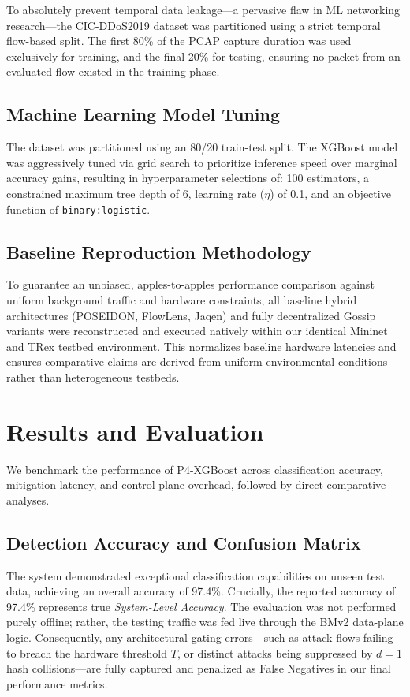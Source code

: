 \documentclass[sigconf, nonacm]{acmart}
\begin{document}
To absolutely prevent temporal data leakage—a pervasive flaw in ML networking research—the CIC-DDoS2019 dataset was partitioned using a strict temporal flow-based split. The first 80\% of the PCAP capture duration was used exclusively for training, and the final 20\% for testing, ensuring no packet from an evaluated flow existed in the training phase.

\subsection{Machine Learning Model Tuning}
The dataset was partitioned using an 80/20 train-test split. The XGBoost model was aggressively tuned via grid search to prioritize inference speed over marginal accuracy gains, resulting in hyperparameter selections of: 100 estimators, a constrained maximum tree depth of 6, learning rate ($\eta$) of 0.1, and an objective function of \texttt{binary:logistic}.

\subsection{Baseline Reproduction Methodology}
To guarantee an unbiased, apples-to-apples performance comparison against uniform background traffic and hardware constraints, all baseline hybrid architectures (POSEIDON, FlowLens, Jaqen) and fully decentralized Gossip variants were reconstructed and executed natively within our identical Mininet and TRex testbed environment. This normalizes baseline hardware latencies and ensures comparative claims are derived from uniform environmental conditions rather than heterogeneous testbeds.

\section{Results and Evaluation}

We benchmark the performance of P4-XGBoost across classification accuracy, mitigation latency, and control plane overhead, followed by direct comparative analyses.

\subsection{Detection Accuracy and Confusion Matrix}
The system demonstrated exceptional classification capabilities on unseen test data, achieving an overall accuracy of 97.4\%. Crucially, the reported accuracy of 97.4\% represents true \textit{System-Level Accuracy}. The evaluation was not performed purely offline; rather, the testing traffic was fed live through the BMv2 data-plane logic. Consequently, any architectural gating errors—such as attack flows failing to breach the hardware threshold $T$, or distinct attacks being suppressed by $d=1$ hash collisions—are fully captured and penalized as False Negatives in our final performance metrics.
\end{document}
